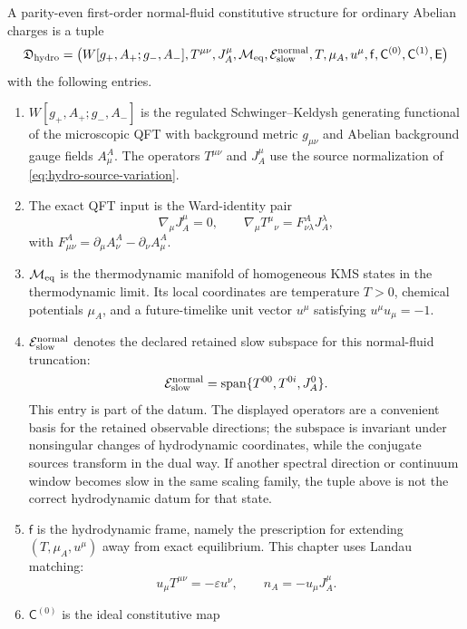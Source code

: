 \begin{definition}
\label{def:first-order-hydrodynamic-datum}
A parity-even first-order normal-fluid constitutive structure for ordinary
Abelian charges is a
tuple
\[
  \mathfrak D_{\rm hydro}
  =
  \bigl(
    W[g_+,A_+;g_-,A_-],
    T^{\mu\nu},J_A^\mu,
    \mathcal M_{\rm eq},
    \mathcal E_{\rm slow}^{\rm normal},
    T,\mu_A,u^\mu,
    \mathsf f,
    \mathsf C^{(0)},\mathsf C^{(1)},
    \mathsf E
  \bigr)
\]
with the following entries.
\begin{enumerate}[label=\textnormal{(\roman*)}]
\item \(W[g_+,A_+;g_-,A_-]\) is the regulated Schwinger--Keldysh generating
  functional of the microscopic QFT with background metric \(g_{\mu\nu}\) and
  Abelian background gauge fields \(A^A_\mu\).  The operators
  \(T^{\mu\nu}\) and \(J_A^\mu\) use the source normalization of
  \eqref{eq:hydro-source-variation}.
\item The exact QFT input is the Ward-identity pair
  \[
    \nabla_\mu J_A^\mu=0,
    \qquad
    \nabla_\mu T^\mu{}_\nu=F^A_{\nu\lambda}J_A^\lambda ,
  \]
  with \(F^A_{\mu\nu}=\partial_\mu A^A_\nu-\partial_\nu A^A_\mu\).
\item \(\mathcal M_{\rm eq}\) is the thermodynamic manifold of homogeneous
  KMS states in the thermodynamic limit.  Its local coordinates are
  temperature \(T>0\), chemical potentials \(\mu_A\), and a
  future-timelike unit vector \(u^\mu\) satisfying \(u^\mu u_\mu=-1\).
\item \(\mathcal E_{\rm slow}^{\rm normal}\) denotes the declared retained
  slow subspace for this normal-fluid truncation:
  \[
    \mathcal E_{\rm slow}^{\rm normal}
    =
    \operatorname{span}\{T^{00},T^{0i},J_A^0\}.
  \]
  This entry is part of the datum.  The displayed operators are a convenient
  basis for the retained observable directions; the subspace is invariant
  under nonsingular changes of hydrodynamic coordinates, while the conjugate
  sources transform in the dual way.  If another spectral direction or
  continuum window becomes slow in the same scaling family, the tuple above
  is not the correct hydrodynamic datum for that state.
\item \(\mathsf f\) is the hydrodynamic frame, namely the prescription for
  extending \((T,\mu_A,u^\mu)\) away from exact equilibrium.  This chapter
  uses Landau matching:
  \[
    u_\mu T^{\mu\nu}=-\varepsilon u^\nu,
    \qquad
    n_A=-u_\mu J_A^\mu .
  \]
\item \(\mathsf C^{(0)}\) is the ideal constitutive map

\end{enumerate}
\end{definition}
